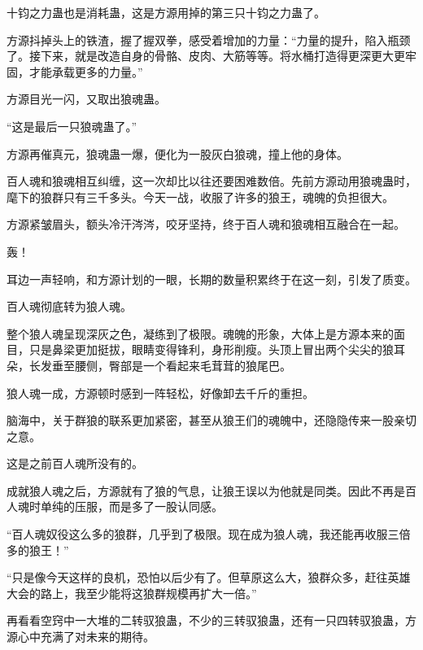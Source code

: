 \begin{this_body}
十钧之力蛊也是消耗蛊，这是方源用掉的第三只十钧之力蛊了。

方源抖掉头上的铁渣，握了握双拳，感受着增加的力量：“力量的提升，陷入瓶颈了。接下来，就是改造自身的骨骼、皮肉、大筋等等。将水桶打造得更深更大更牢固，才能承载更多的力量。”

方源目光一闪，又取出狼魂蛊。

“这是最后一只狼魂蛊了。”

方源再催真元，狼魂蛊一爆，便化为一股灰白狼魂，撞上他的身体。

百人魂和狼魂相互纠缠，这一次却比以往还要困难数倍。先前方源动用狼魂蛊时，麾下的狼群只有三千多头。今天一战，收服了许多的狼王，魂魄的负担很大。

方源紧皱眉头，额头冷汗涔涔，咬牙坚持，终于百人魂和狼魂相互融合在一起。

轰！

耳边一声轻响，和方源计划的一眼，长期的数量积累终于在这一刻，引发了质变。

百人魂彻底转为狼人魂。

整个狼人魂呈现深灰之色，凝练到了极限。魂魄的形象，大体上是方源本来的面目，只是鼻梁更加挺拔，眼睛变得锋利，身形削瘦。头顶上冒出两个尖尖的狼耳朵，长发垂至腰侧，臀部是一个看起来毛茸茸的狼尾巴。

狼人魂一成，方源顿时感到一阵轻松，好像卸去千斤的重担。

脑海中，关于群狼的联系更加紧密，甚至从狼王们的魂魄中，还隐隐传来一股亲切之意。

这是之前百人魂所没有的。

成就狼人魂之后，方源就有了狼的气息，让狼王误以为他就是同类。因此不再是百人魂时单纯的压服，而是多了一股认同感。

“百人魂奴役这么多的狼群，几乎到了极限。现在成为狼人魂，我还能再收服三倍多的狼王！”

“只是像今天这样的良机，恐怕以后少有了。但草原这么大，狼群众多，赶往英雄大会的路上，我至少能将这狼群规模再扩大一倍。”

再看看空窍中一大堆的二转驭狼蛊，不少的三转驭狼蛊，还有一只四转驭狼蛊，方源心中充满了对未来的期待。

\end{this_body}

